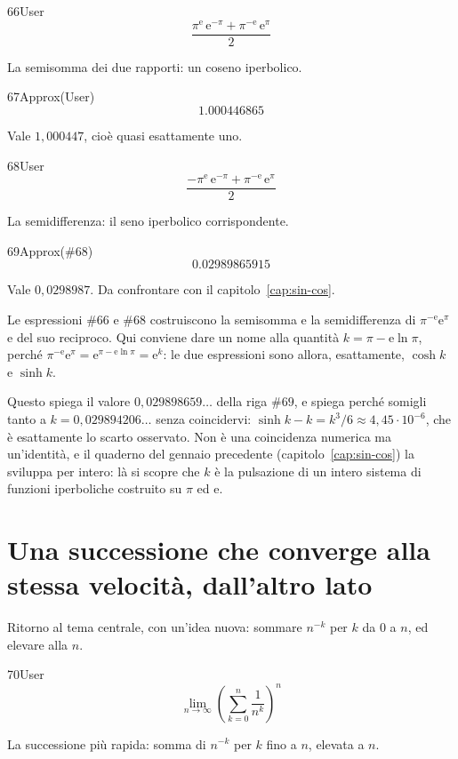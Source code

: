 \begin{espr}{66}{User}{}
\[
\frac{\pi^{\mathrm{e}}\, \mathrm{e}^{-\pi} + \pi^{-\mathrm{e}}\, \mathrm{e}^{\pi}}{2}
\]
\end{espr}
La semisomma dei due rapporti: un coseno iperbolico.

\begin{espr}{67}{Approx(User)}{}
\[
1.000446865
\]
\end{espr}
Vale $1{,}000447$, cioè quasi esattamente uno.

\begin{espr}{68}{User}{}
\[
\frac{-\pi^{\mathrm{e}}\, \mathrm{e}^{-\pi} + \pi^{-\mathrm{e}}\, \mathrm{e}^{\pi}}{2}
\]
\end{espr}
La semidifferenza: il seno iperbolico corrispondente.

\begin{espr}{69}{Approx(\#68)}{}
\[
0.02989865915
\]
\end{espr}
Vale $0{,}0298987$. Da confrontare con il capitolo~\ref{cap:sin-cos}.


Le espressioni $\#66$ e $\#68$ costruiscono la semisomma e la semidifferenza di $\pi^{-\mathrm{e}}\mathrm{e}^{\pi}$ e del suo reciproco. Qui conviene dare un nome alla quantità $k=\pi-\mathrm{e}\ln\pi$, perché $\pi^{-\mathrm{e}}\mathrm{e}^{\pi}=\mathrm{e}^{\pi-\mathrm{e}\ln\pi}=\mathrm{e}^{k}$: le due espressioni sono allora, esattamente, $\cosh k$ e $\sinh k$.

Questo spiega il valore $0{,}029898659\ldots$ della riga $\#69$, e spiega perché somigli tanto a $k=0{,}029894206\ldots$ senza coincidervi: $\sinh k-k=k^3/6\approx 4{,}45\cdot10^{-6}$, che è esattamente lo scarto osservato. Non è una coincidenza numerica ma un'identità, e il quaderno  del gennaio precedente (capitolo~\ref{cap:sin-cos}) la sviluppa per intero: là si scopre che $k$ è la pulsazione di un intero sistema di funzioni iperboliche costruito su $\pi$ ed $\mathrm{e}$.

\section{Una successione che converge alla stessa velocità, dall'altro lato}

Ritorno al tema centrale, con un'idea nuova: sommare $n^{-k}$ per $k$ da $0$ a $n$, ed elevare alla $n$.

\begin{espr}{70}{User}{}
\[
\lim_{n \to \infty} \left(\sum_{k=0}^{n} \frac{1}{n^{k}}\right)^{n}
\]
\end{espr}
La successione più rapida: somma di $n^{-k}$ per $k$ fino a $n$, elevata a $n$.

